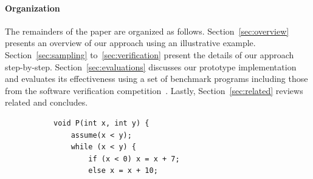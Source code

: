 \paragraph{Organization} The remainders of the paper are organized as follows. Section~\ref{sec:overview} presents an overview of our approach using an illustrative example. Section~\ref{sec:sampling} to~\ref{sec:verification} present the details of our approach step-by-step. Section~\ref{sec:evaluations} discusses our prototype implementation and evaluates its effectiveness using a set of benchmark programs including those from the software verification competition~\cite{}. Lastly, Section~\ref{sec:related} reviews related and concludes.

\begin{figure}[t]
\begin{subfigure}{0.5\textwidth}
    \raggedright 
    \vspace{0.5cm}
{\scriptsize\begin{verbatim}
void P(int x, int y) {
    assume(x < y);
    while (x < y) {
        if (x < 0) x = x + 7;
        else x = x + 10;


\end{verbatim}}
\end{subfigure}
\end{figure}
